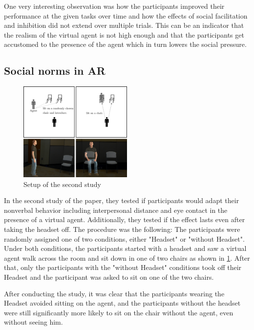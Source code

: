One very interesting observation was how the participants improved their performance at the given tasks over time and how the effects of social facilitation and inhibition did not extend over multiple trials. This can be an indicator that the realism of the virtual agent is not high enough and that the participants get accustomed to the presence of the agent which in turn lowers the social pressure.

\subsection{Social norms in AR}

\begin{figure}[H]
\centering
\includegraphics[width = 0.5\textwidth]{figures/pone.0216290.g004.PNG_L.png}
\caption[Study 1 result]{Setup of the second study}
\label{fig::secondStudy}
\end{figure}

In the second study of the paper, they tested if participants would adapt their nonverbal behavior including interpersonal distance and eye contact in the presence of a virtual agent. Additionally, they tested if the effect lasts even after taking the headset off. The procedure was the following: The participants were randomly assigned one of two conditions, either "Headset" or "without Headset". Under both conditions, the participants started with a headset and saw a virtual agent walk across the room and sit down in one of two chairs as shown in \ref{fig::secondStudy}. After that, only the participants with the "without Headset" conditions took off their Headset and the participant was asked to sit on one of the two chairs. 

After conducting the study, it was clear that the participants wearing the Headset avoided sitting on the agent, and the participants without the headset were still significantly more likely to sit on the chair without the agent, even without seeing him.

